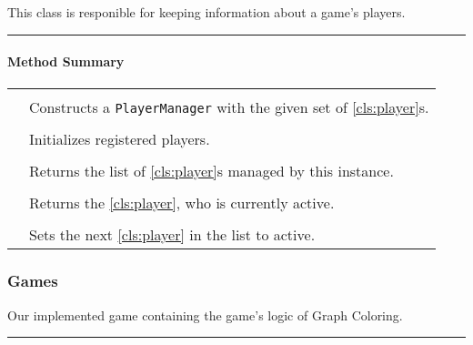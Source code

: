 This class is responible for keeping information about a game's players.  \\

\vspace{.5cm}
\hrule

\paragraph*{Method Summary}
\paragraph*{}
\begin{longtable}{Lp{10cm}}
	\startmethodtable
	 \\
	& Constructs a \texttt{PlayerManager} with the given set of \ref{cls:player}s. \\
	 \\
	& Initializes registered players. \\
	 \\
	& Returns the list of \ref{cls:player}s managed by this instance. \\
	 \\
	& Returns the \ref{cls:player}, who is currently active. \\
	 \\
	& Sets the next \ref{cls:player} in the list to active. \\
	
	
	\hline
\end{longtable}



\subsubsection{Games}


Our implemented game containing the game's logic of Graph Coloring. \\

\vspace{.5cm}
\hrule

